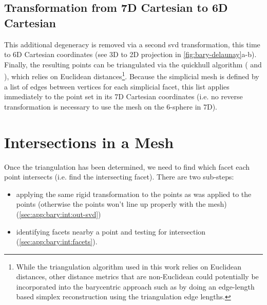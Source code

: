 \documentclass[final,12pt]{elsarticle}
\begin{document}
\subsection{ Transformation from 7D Cartesian to 6D Cartesian}
\label{sec:app:bary:tri:svd2}
This additional degeneracy is removed via a second \gls{svd} transformation, this time to 6D Cartesian coordinates (see 3D to 2D projection in \cref{fig:bary-delaunay}a-b). Finally, the resulting points can be triangulated via the quickhull algorithm \cite{barberQuickhullAlgorithmConvex1996} ( and ), which relies on Euclidean distances\footnote{While the triangulation algorithm used in this work relies on Euclidean distances, other distance metrics that are non-Euclidean \cite{morawiecDistancesGrainInterfaces2019} could potentially be incorporated into the barycentric approach such as by doing an edge-length based simplex reconstruction \cite{connorHighdimensionalSimplexesSupermetric2017,boissonnatOnlyDistancesAre2017} using the triangulation edge lengths.}. Because the simplicial mesh is defined by a list of edges between vertices for each simplicial facet, this list applies immediately to the point set in its 7D Cartesian coordinates (i.e. no reverse transformation is necessary to use the mesh on the 6-sphere in 7D).

\section{Intersections in a Mesh}
\label{sec:app:bary:int}

Once the triangulation has been determined, we need to find which facet each \outpt{} point intersects (i.e. find the intersecting facet). There are two sub-steps:
\begin{itemize}%
	\item[2.1] applying the same rigid transformation to the \outpt{} points as was applied to the \inpt{} points (otherwise the \outpt{} points won't line up properly with the mesh) (\cref{sec:app:bary:int:out-svd})
	\item[2.2] identifying facets nearby a \outpt{} point and testing for intersection (\cref{sec:app:bary:int:facets}).
\end{itemize}
\end{document}

